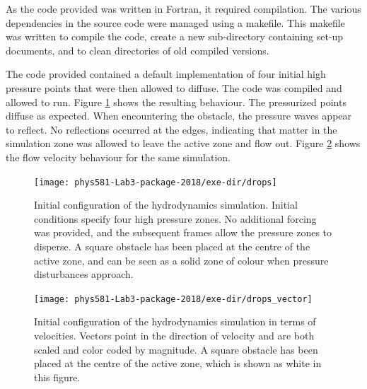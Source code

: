 \documentclass[twocolumn]{article}
\begin{document}
As the code provided was written in Fortran, it required compilation. The various dependencies in the source code were managed using a makefile. This makefile was written to compile the code, create a new sub-directory containing set-up documents, and to clean directories of old compiled versions. 

The code provided contained a default implementation of four initial high pressure points that were then allowed to diffuse. The code was compiled and allowed to run. Figure \ref{fig:drops} shows the resulting behaviour. The pressurized points diffuse as expected. When encountering the obstacle, the pressure waves appear to reflect. No reflections occurred at the edges, indicating that matter in the simulation zone was allowed to leave the active zone and flow out. Figure \ref{fig:drops_vector} shows the flow velocity behaviour for the same simulation.

\begin{figure}
\centering
\texttt{[image: phys581-Lab3-package-2018/exe-dir/drops]}
\caption{Initial configuration of the hydrodynamics simulation. Initial conditions specify four high pressure zones. No additional forcing was provided, and the subsequent frames allow the pressure zones to disperse. A square obstacle has been placed at the centre of the active zone, and can be seen as a solid zone of colour when pressure disturbances approach.}
\label{fig:drops}
\end{figure}

\begin{figure}
	\centering
	\texttt{[image: phys581-Lab3-package-2018/exe-dir/drops\_vector]}
	\caption{Initial configuration of the hydrodynamics simulation in terms of velocities. Vectors point in the direction of velocity and are both scaled and color coded by magnitude. A square obstacle has been placed at the centre of the active zone, which is shown as white in this figure.}
	\label{fig:drops_vector}
\end{figure}
\end{document}
